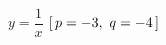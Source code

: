 \hspace*{2mm}\begin{minipage}[t]{\dimexpr\linewidth-2mm\relax}\vspace{0pt}
$y=\dfrac{1}{x}$ \quad $[\mkern3mu p=-3,\ q=-4\mkern3mu ]$\end{minipage}
